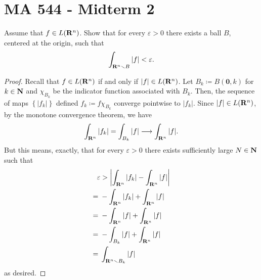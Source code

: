 \section{MA 544 - Midterm 2}
\begin{problem}
Assume that $f\in L(\mathbf{R}^n)$. Show that for every $\varepsilon>0$ there
exists a ball $B$, centered at the origin, such that
\[
\int_{\mathbf{R}^n\smallsetminus B}|f|<\varepsilon.
\]
\end{problem}
\begin{proof}
Recall that $f\in L(\mathbf{R}^n)$ if and only if $|f|\in
L(\mathbf{R}^n)$. Let $B_k\coloneqq B(\mathbf{0},k)$ for $k\in\mathbf{N}$ and
$\chi_{B_k}$ be the indicator function associated with $B_k$. Then, the
sequence of maps $\left\{|f_k|\right\}$ defined $f_k\coloneqq f\chi_{B_k}$
converge pointwise to $|f_k|$. Since $|f|\in L(\mathbf{R}^n)$, by the monotone
convergence theorem, we have
\begin{equation}
\label{eq:monotonicity-2-1}
\int_{\mathbf{R}^n} |f_k|=\int_{B_k}|f|\longrightarrow\int_{\mathbf{R}^n}|f|.
\end{equation}
But this means, exactly, that for every $\varepsilon>0$ there exists
sufficiently large $N\in\mathbf{N}$ such that
\begin{equation}
\label{eq:desired-inequality-2-1}
\begin{aligned}
\varepsilon&>\left|\int_{\mathbf{R}^n}|f_k|-\int_{\mathbf{R}^n}|f|\right|\\
={}&-\int_{\mathbf{R}^n}|f_k|+\int_{\mathbf{R}^n}|f|\\
={}&-\int_{\mathbf{R}^n}|f|+\int_{\mathbf{R}^n}|f|\\
={}&-\int_{B_k}|f|+\int_{\mathbf{R}^n}|f|\\
={}&\int_{\mathbf{R}^n\smallsetminus B_k}|f|
\end{aligned}
\end{equation}
as desired.
\end{proof}

